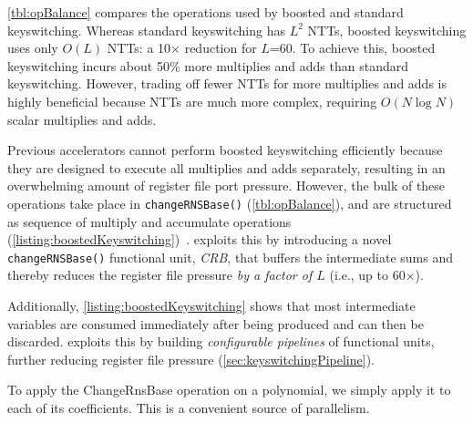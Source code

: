 \tblOpBalance

\autoref{tbl:opBalance} compares the operations used by boosted and standard keyswitching.
Whereas standard keyswitching has $L^2$ NTTs, boosted keyswitching uses only $O(L)$ NTTs:
a 10$\times$ reduction for $L$=60. To achieve this, boosted keyswitching incurs about 50\%
more multiplies and adds than standard keyswitching.
However, trading off fewer NTTs for more multiplies and adds is highly beneficial
because NTTs are much more complex, requiring $O(N \log N)$ scalar multiplies and adds.

Previous accelerators cannot perform boosted keyswitching efficiently because
they are designed to execute all multiplies and adds separately, resulting in an
overwhelming amount of register file port pressure.
However, the bulk of these \mbox{operations} take place in \verb!changeRNSBase()!
(\autoref{tbl:opBalance}), and are structured as sequence of multiply and accumulate
operations (\autoref{listing:boostedKeyswitching})~\cite{bajard:2016:full}.
\name exploits this by introducing a novel \verb!changeRNSBase()! functional
unit, \emph{CRB}, that buffers the intermediate sums and thereby reduces the
register file pressure \emph{by a factor of $L$} (i.e., up to 60$\times$).

Additionally, \autoref{listing:boostedKeyswitching} shows that most intermediate
variables are consumed immediately after being produced and can then be discarded.
\name exploits this by building \emph{configurable pipelines} of functional units,
further reducing register file pressure (\autoref{sec:keyswitchingPipeline}).




 

To apply the ChangeRnsBase operation on a polynomial, we simply apply it to
each of its coefficients. This is a convenient source of parallelism.

